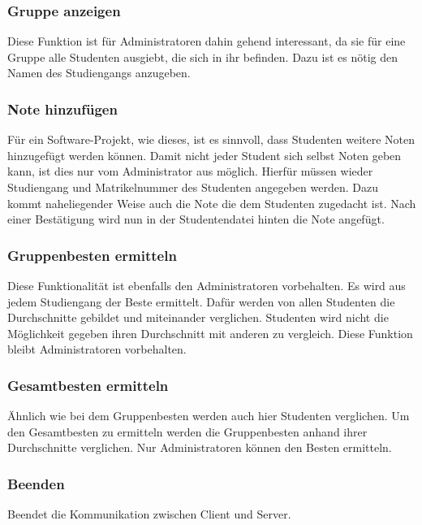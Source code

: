 \documentclass{scrartcl}
\begin{document}
		\subsubsection{Gruppe anzeigen}
			Diese Funktion ist für Administratoren dahin gehend interessant, da sie für eine Gruppe alle Studenten ausgiebt, die sich in ihr befinden. Dazu ist es nötig den Namen des Studiengangs anzugeben.
		\subsubsection{Note hinzufügen}
			Für ein Software-Projekt, wie dieses, ist es sinnvoll, dass Studenten weitere Noten hinzugefügt werden können. Damit nicht jeder Student sich selbst Noten geben kann, ist dies nur vom Administrator aus möglich. Hierfür müssen wieder Studiengang und Matrikelnummer des Studenten angegeben werden. Dazu kommt naheliegender Weise auch die Note die dem Studenten zugedacht ist. Nach einer Bestätigung wird nun in der Studentendatei hinten die Note angefügt.
		\subsubsection{Gruppenbesten ermitteln}
			Diese Funktionalität ist ebenfalls den Administratoren vorbehalten. Es wird aus jedem Studiengang der Beste ermittelt. Dafür werden von allen Studenten die Durchschnitte gebildet und miteinander verglichen. Studenten wird nicht die Möglichkeit gegeben ihren Durchschnitt mit anderen zu vergleich. Diese Funktion bleibt Administratoren vorbehalten.
		\subsubsection{Gesamtbesten ermitteln}
			Ähnlich wie bei dem Gruppenbesten werden auch hier Studenten verglichen. Um den Gesamtbesten zu ermitteln werden die Gruppenbesten anhand ihrer Durchschnitte verglichen. Nur Administratoren können den Besten ermitteln.
		\subsubsection{Beenden}
			Beendet die Kommunikation zwischen Client und Server. 
\end{document}

